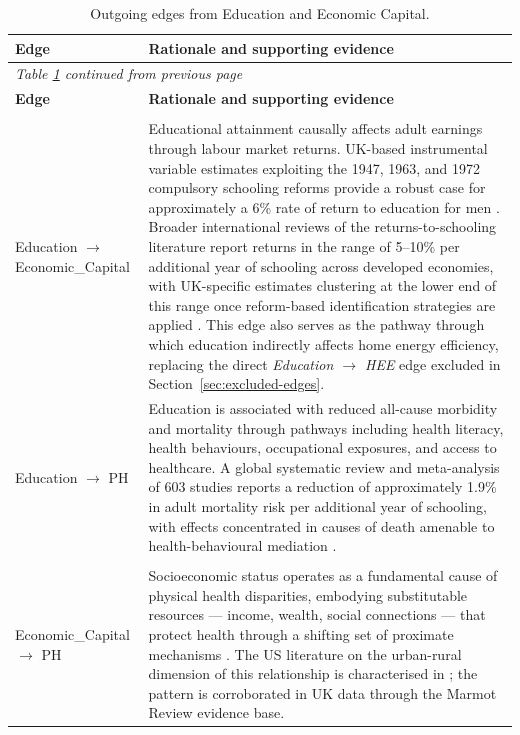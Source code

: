 \begin{longtable}{@{}p{3.8cm}p{11.2cm}@{}}
\caption{Outgoing edges from Education and Economic Capital.}
\label{tab:edges-econ_edu}\\
\toprule
\textbf{Edge} & \textbf{Rationale and supporting evidence} \\
\midrule
\endfirsthead
\multicolumn{2}{l}{\textit{Table \ref{tab:edges-econ_edu} continued from previous page}}\\
\toprule
\textbf{Edge} & \textbf{Rationale and supporting evidence} \\
\midrule
\endhead
\bottomrule
\endfoot
\multicolumn{2}{@{}l}{\textit{Education outgoing edges}}\\
\addlinespace
Education $\to$ Economic\_Capital & Educational attainment causally affects adult earnings through labour market returns. UK-based instrumental variable estimates exploiting the 1947, 1963, and 1972 compulsory schooling reforms provide a robust case for approximately a 6\% rate of return to education for men \citep{dolton_returning_2017}. Broader international reviews of the returns-to-schooling literature report returns in the range of 5--10\% per additional year of schooling across developed economies, with UK-specific estimates clustering at the lower end of this range once reform-based identification strategies are applied \citep{card_causal_1999, blau_american_1978}. This edge also serves as the pathway through which education indirectly affects home energy efficiency, replacing the direct \textit{Education $\to$ HEE} edge excluded in Section~\ref{sec:excluded-edges}. \\
\addlinespace
Education $\to$ PH & Education is associated with reduced all-cause morbidity and mortality through pathways including health literacy, health behaviours, occupational exposures, and access to healthcare. A global systematic review and meta-analysis of 603 studies reports a reduction of approximately 1.9\% in adult mortality risk per additional year of schooling, with effects concentrated in causes of death amenable to health-behavioural mediation \citep{balaj_effects_2024}. \\
\addlinespace
\multicolumn{2}{@{}l}{\textit{Economic Capital outgoing edges}}\\
\addlinespace
Economic\_Capital $\to$ PH & Socioeconomic status operates as a fundamental cause of physical health disparities, embodying substitutable resources — income, wealth, social connections — that protect health through a shifting set of proximate mechanisms \citep{link_social_1995, phelan_social_2010}. The US literature on the urban-rural dimension of this relationship is characterised in \citet{blumenthal_effects_2002}; the pattern is corroborated in UK data through the Marmot Review evidence base. \\

\end{longtable}
